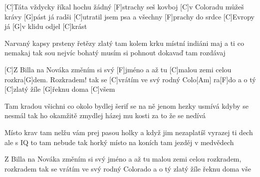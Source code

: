 
[C]Táta vždycky říkal hochu žádný [F]strachy
seš kovboj [C]v Coloradu můžeš krávy [G]pást
já radši [C]utratil jsem psa a všechny [F]prachy
do srdce [C]Evropy já [G]v klidu odjel [C]krást

Narvaný kapsy prsteny řetězy zlatý
tam kolem krku místní indiáni maj
a ti co nemakaj tak sou nejvíc bohatý
musím si pohnout dokavaď tam rozdávaj

[C]Z Billa na Nováka změním si svý [F]jméno
a až tu [C]malou zemi celou rozkra[G]dem. Rozkradem!
tak se [C]vrátím ve svý rodný Colo[Am] ra[F]do
a o tý [C]zlatý žíle [G]\null řeknu doma [C]všem


	Tam kradou všichni co okolo bydlej
	šerif se na ně jenom hezky usmívá
	kdyby se nesmál tak ho okamžitě zmydlej
	házej mu kosti za to že se nedívá
	
	Místo krav tam nelžu vám prej pasou holky
	a když jim nezaplatíš vyrazej ti dech
	ale s IQ to tam nebude tak horký
	místo na koních tam jezděj v medvědech

	Z Billa na Nováka změním si svý jméno
	a až tu malou zemi celou rozkradem, rozkradem
	tak se vrátím ve svý rodný Colorado
	a o tý zlatý žíle řeknu doma vše